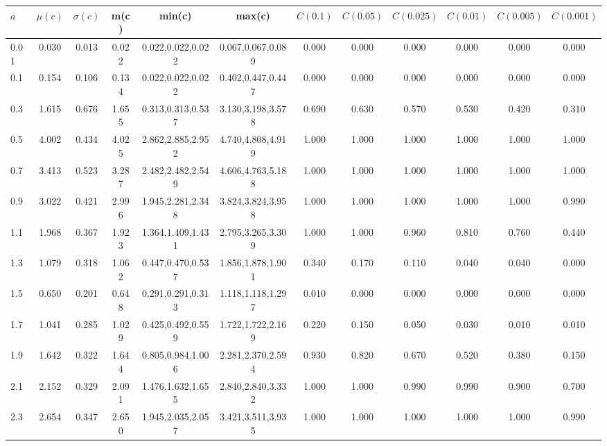 \begin{table*}[h!]
\begin{center}
\begin{tabular}{| l | c | c | c | c | c | c | c | c | c | c | c |}\hline
$a$ & $\mu(c)$ & $\sigma(c)$ & m(c) & min(c) & max(c) & $\overline{C(0.1)}$ & $\overline{C(0.05)}$ & $\overline{C(0.025)}$ & $\overline{C(0.01)}$ & $\overline{C(0.005)}$ & $\overline{C(0.001)}$ \\\hline
0.01 & 0.030 & 0.013 & 0.022 & 0.022,0.022,0.022 & 0.067,0.067,0.089  & 0.000  & 0.000  & 0.000  & 0.000  & 0.000  & 0.000 \\\hline
0.1 & 0.154 & 0.106 & 0.134 & 0.022,0.022,0.022 & 0.402,0.447,0.447  & 0.000  & 0.000  & 0.000  & 0.000  & 0.000  & 0.000 \\\hline
0.3 & 1.615 & 0.676 & 1.655 & 0.313,0.313,0.537 & 3.130,3.198,3.578  & 0.690  & 0.630  & 0.570  & 0.530  & 0.420  & 0.310 \\\hline
0.5 & 4.002 & 0.434 & 4.025 & 2.862,2.885,2.952 & 4.740,4.808,4.919  & 1.000  & 1.000  & 1.000  & 1.000  & 1.000  & 1.000 \\\hline
0.7 & 3.413 & 0.523 & 3.287 & 2.482,2.482,2.549 & 4.606,4.763,5.188  & 1.000  & 1.000  & 1.000  & 1.000  & 1.000  & 1.000 \\\hline
0.9 & 3.022 & 0.421 & 2.996 & 1.945,2.281,2.348 & 3.824,3.824,3.958  & 1.000  & 1.000  & 1.000  & 1.000  & 1.000  & 0.990 \\\hline
1.1 & 1.968 & 0.367 & 1.923 & 1.364,1.409,1.431 & 2.795,3.265,3.309  & 1.000  & 1.000  & 0.960  & 0.810  & 0.760  & 0.440 \\\hline
1.3 & 1.079 & 0.318 & 1.062 & 0.447,0.470,0.537 & 1.856,1.878,1.901  & 0.340  & 0.170  & 0.110  & 0.040  & 0.040  & 0.000 \\\hline
1.5 & 0.650 & 0.201 & 0.648 & 0.291,0.291,0.313 & 1.118,1.118,1.297  & 0.010  & 0.000  & 0.000  & 0.000  & 0.000  & 0.000 \\\hline
1.7 & 1.041 & 0.285 & 1.029 & 0.425,0.492,0.559 & 1.722,1.722,2.169  & 0.220  & 0.150  & 0.050  & 0.030  & 0.010  & 0.010 \\\hline
1.9 & 1.642 & 0.322 & 1.644 & 0.805,0.984,1.006 & 2.281,2.370,2.594  & 0.930  & 0.820  & 0.670  & 0.520  & 0.380  & 0.150 \\\hline
2.1 & 2.152 & 0.329 & 2.091 & 1.476,1.632,1.655 & 2.840,2.840,3.332  & 1.000  & 1.000  & 0.990  & 0.990  & 0.900  & 0.700 \\\hline
2.3 & 2.654 & 0.347 & 2.650 & 1.945,2.035,2.057 & 3.421,3.511,3.935  & 1.000  & 1.000  & 1.000  & 1.000  & 1.000  & 0.990 \\\hline

\end{tabular}
\end{center}
\end{table*}

